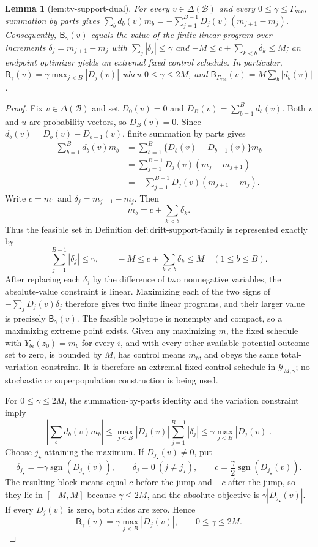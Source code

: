 \documentclass{article}
\newtheorem{lemma}{Lemma}
\begin{document}
\begin{lemma}[lem:tv-support-dual]\label{lem:tv-support-dual}
For every \(v\in\Delta(\mathcal B)\) and every \(0\le\gamma\le\Gamma_{\mathrm{vac}}\), summation by parts gives \(\sum_bd_b(v)m_b=-\sum_{j=1}^{B-1}D_j(v)(m_{j+1}-m_j)\). Consequently, \(\mathsf B_\gamma(v)\) equals the value of the finite linear program over increments \(\delta_j=m_{j+1}-m_j\) with \(\sum_j|\delta_j|\le\gamma\) and \(-M\le c+\sum_{k<b}\delta_k\le M\); an endpoint optimizer yields an extremal fixed control schedule. In particular, \(\mathsf B_\gamma(v)=\gamma\max_{j<B}|D_j(v)|\) when \(0\le\gamma\le2M\), and \(\mathsf B_{\Gamma_{\mathrm{vac}}}(v)=M\sum_b|d_b(v)|\).
\end{lemma}
\begin{proof}
Fix \(v\in\Delta(\mathcal B)\) and set \(D_0(v)=0\) and \(D_B(v)=\sum_{b=1}^Bd_b(v)\).  Both \(v\) and \(u\) are probability vectors, so \(D_B(v)=0\).  Since \(d_b(v)=D_b(v)-D_{b-1}(v)\), finite summation by parts gives
\[
\begin{aligned}
\sum_{b=1}^Bd_b(v)m_b
&=\sum_{b=1}^B\{D_b(v)-D_{b-1}(v)\}m_b\\
&=\sum_{j=1}^{B-1}D_j(v)(m_j-m_{j+1})\\
&=-\sum_{j=1}^{B-1}D_j(v)(m_{j+1}-m_j).
\end{aligned}
\]
Write \(c=m_1\) and \(\delta_j=m_{j+1}-m_j\).  Then
\[
m_b=c+\sum_{k<b}\delta_k.
\]
Thus the feasible set in Definition \(\mathrm{def:drift\text{-}support\text{-}family}\) is represented exactly by
\[
\sum_{j=1}^{B-1}|\delta_j|\le\gamma,
\qquad
-M\le c+\sum_{k<b}\delta_k\le M
\quad(1\le b\le B).
\]
After replacing each \(\delta_j\) by the difference of two nonnegative variables, the absolute-value constraint is linear.  Maximizing each of the two signs of
\(-\sum_jD_j(v)\delta_j\) therefore gives two finite linear programs, and their larger value is precisely \(\mathsf B_\gamma(v)\).  The feasible polytope is nonempty and compact, so a maximizing extreme point exists.  Given any maximizing \(m\), the fixed schedule with \(Y_{bi}(z_0)=m_b\) for every \(i\), and with every other available potential outcome set to zero, is bounded by \(M\), has control means \(m_b\), and obeys the same total-variation constraint.  It is therefore an extremal fixed control schedule in \(\mathcal Y_{M,\gamma}\); no stochastic or superpopulation construction is being used.

For \(0\le\gamma\le2M\), the summation-by-parts identity and the variation constraint imply
\[
\left|\sum_bd_b(v)m_b\right|
\le \max_{j<B}|D_j(v)|\sum_{j=1}^{B-1}|\delta_j|
\le\gamma\max_{j<B}|D_j(v)|.
\]
Choose \(j_\star\) attaining the maximum.  If \(D_{j_\star}(v)\ne0\), put
\[
\delta_{j_\star}=-\gamma\operatorname{sgn}(D_{j_\star}(v)),
\qquad \delta_j=0\ (j\ne j_\star),
\qquad c=\frac{\gamma}{2}\operatorname{sgn}(D_{j_\star}(v)).
\]
The resulting block means equal \(c\) before the jump and \(-c\) after the jump, so they lie in \([-M,M]\) because \(\gamma\le2M\), and the absolute objective is
\(\gamma|D_{j_\star}(v)|\).  If every \(D_j(v)\) is zero, both sides are zero.  Hence
\[
\mathsf B_\gamma(v)=\gamma\max_{j<B}|D_j(v)|,
\qquad 0\le\gamma\le2M.
\]


\end{proof}
\end{document}
